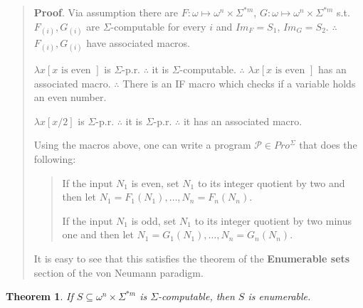 \documentclass[a4paper, 12pt]{article}
\newtheorem{theorem}{Theorem}
\newtheorem{theorem}{Theorem}
\begin{document}
\small
\begin{quote}

\textbf{Proof}. Via assumption there are $F : \omega \mapsto \omega^{n} \times
\Sigma^{*m} $, $G : \omega \mapsto \omega^{n} \times \Sigma^{*m} $ s.t.
$F_{(i)}, G_{(i)}$ are $\Sigma$-computable for every $i$ and $Im_F = S_1$, $Im_G =
S_2$. $\therefore $ $F_{(i)}, G_{(i)}$ have associated macros. 

$\lambda x \left[ x \text{ is even }  \right]$ is $\Sigma$-p.r. $\therefore $  it
is $\Sigma$-computable. $\therefore $ $\lambda x \left[ x \text{ is even }
\right]$ has an associated macro. $\therefore $ There is an IF macro which
checks if a variable holds an even number.

$\lambda x \left[ x/2  \right]$ is $\Sigma$-p.r. $\therefore $ it is
$\Sigma$-p.r. $\therefore $ it has an associated macro.

Using the macros above, one can write a program $\mathcal{P} \in Pro^{\Sigma}$
that does the following: 

\footnotesize
\begin{quote}
    If the input $N_1$ is even, set $N_1$ to its integer quotient by two and
    then let $N_1 = F_1(N_1), \ldots, N_n = F_n(N_n)$. 

    If the input $N_1$ is odd, set $N_1$ to its integer quotient by two minus
    one and then let $N_1 = G_1(N_1), \ldots, N_n = G_n(N_n)$. 
\end{quote}

It is easy to see that this satisfies the theorem of the \textbf{Enumerable
sets} section of the von Neumann paradigm.

\end{quote}
\normalsize

\begin{theorem}
    If $S \subseteq \omega^{n} \times \Sigma^{*m} $ is $\Sigma$-computable, then
    $S$ is enumerable.
\end{theorem}
\end{document}
